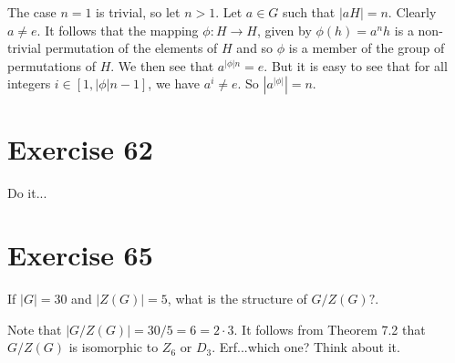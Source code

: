 \documentclass[12pt]{article}
\begin{document}
The case $n=1$ is trivial, so let $n>1$.  Let $a\in G$ such that $|aH|=n$.  Clearly $a\neq e$.
It follows that the mapping $\phi:H\to H$, given by $\phi(h)=a^nh$ is a non-trivial permutation of
the elements of $H$ and so $\phi$ is a member of the group of permutations of $H$.
We then see that $a^{|\phi|n}=e$.  But it is easy to see that for all
integers $i\in [1,|\phi|n-1]$, we have $a^i\neq e$.  So $|a^{|\phi|}|=n$.

\section*{Exercise 62}

Do it...

\section*{Exercise 65}

If $|G|=30$ and $|Z(G)|=5$, what is the
structure of $G/Z(G)?$.

Note that $|G/Z(G)|=30/5=6=2\cdot 3$.
It follows from Theorem 7.2 that $G/Z(G)$
is isomorphic to $Z_6$ or $D_3$.  Erf...which one?
Think about it.
\end{document}
